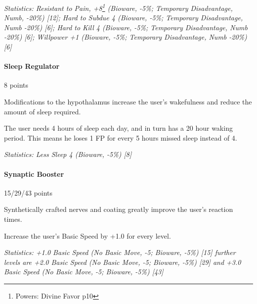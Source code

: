 \begin{multicols*}{3}
	\textit{\textcolor{OliveGreen}{Statistics: Resistant to Pain, +8\footnote{Powers: Divine Favor p10} (Bioware, -5\%; Temporary Disadvantage, Numb, -20\%) [12]; Hard to Subdue 4 (Bioware, -5\%; Temporary Disadvantage, Numb -20\%) [6]; Hard to Kill 4 (Bioware, -5\%; Temporary Disadvantage, Numb -20\%) [6]; Willpower +1 (Bioware, -5\%; Temporary Disadvantage, Numb -20\%) [6] }}
	
	\paragraph{Sleep Regulator}
	\begin{flushright}
		8 points
	\end{flushright}
	
	Modifications to the hypothalamus increase the user's wakefulness and reduce the amount of sleep required. 
	
	The user needs 4 hours of sleep each day, and in turn has a 20 hour waking period. This means he loses 1 FP for every 5 hours missed sleep instead of 4.
	
	\textit{\textcolor{OliveGreen}{Statistics: Less Sleep 4 (Bioware, -5\%) [8]}}
	
	\paragraph{Synaptic Booster}
	\begin{flushright}
		15/29/43 points
	\end{flushright}
	
	Synthetically crafted nerves and coating greatly improve the user's reaction times.
	
	Increase the user's Basic Speed by +1.0 for every level.
	
	\textit{\textcolor{OliveGreen}{Statistics: +1.0 Basic Speed (No Basic Move, -5; Bioware, -5\%) [15] further levels are +2.0 Basic Speed (No Basic Move, -5; Bioware, -5\%) [29] and +3.0 Basic Speed (No Basic Move, -5; Bioware, -5\%) [43]}}
	
\end{multicols*}